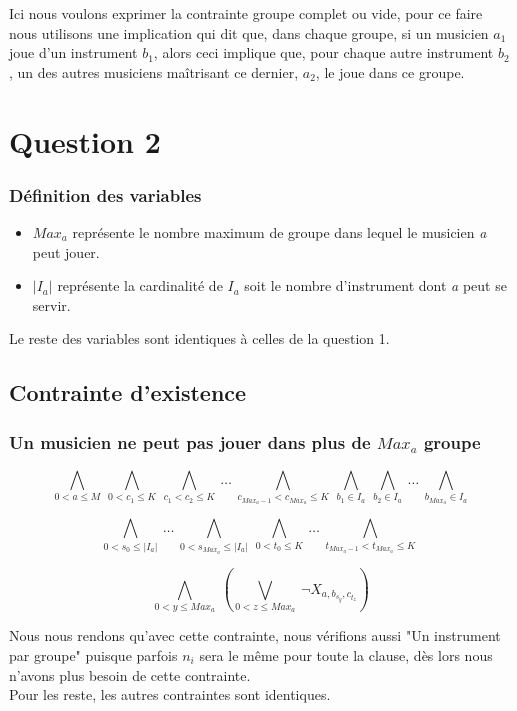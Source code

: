 \documentclass[11pt]{article}
\begin{document}
Ici nous voulons exprimer la contrainte groupe complet ou vide, pour ce faire nous utilisons une implication qui dit que, dans chaque groupe, si un musicien $a_1$ joue d'un instrument $b_1$, alors ceci implique que, pour chaque autre instrument $b_2$, un des autres musiciens maîtrisant ce dernier, $a_2$, le joue dans ce groupe.

\section{Question 2}

\subsubsection{Définition des variables}

\begin{itemize}
\item $Max_a$ représente le nombre maximum de groupe dans lequel le musicien \textit{a} peut jouer.
\item $|I_a|$ représente la cardinalité de $I_a$ soit le nombre d'instrument dont \textit{a} peut se servir.
\end{itemize}

Le reste des variables sont identiques à celles de la question 1.

\subsection{Contrainte d'existence}

\subsubsection{Un musicien ne peut pas jouer dans plus de $Max_a$ groupe}

$$\bigwedge\limits_{0<a\le M}\ \bigwedge\limits_{0<c_1\le K}\ \bigwedge\limits_{c_1<c_2\le K}\ \ldots\ \bigwedge\limits_{c_{{Max_a}-1}<c_{Max_a}\le K}\ \bigwedge\limits_{b_1 \in I_a}\ \bigwedge\limits_{b_2 \in I_a}\ \ldots\  \bigwedge\limits_{b_{Max_a} \in I_a} $$

$$\bigwedge\limits_{0<s_0\le |I_a|}\  \ldots\  \bigwedge\limits_{0<s_{Max_a}\le |I_a|}\ \bigwedge\limits_{0<t_{0}\le K}\  \ldots\  \bigwedge\limits_{t_{Max_a-1}<t_{Max_a}\le K}\ $$

$$ \bigwedge\limits_{0<y\le Max_a}\  \left( \bigvee\limits_{0<z\le Max_a}\  \neg X_{a,b_{s_{y}},c_{t_{z}}}\right)$$

Nous nous rendons qu'avec cette contrainte, nous vérifions aussi "Un instrument par groupe" puisque parfois $n_i$ sera le même pour toute la clause, dès lors nous n'avons plus besoin de cette contrainte.\\
Pour les reste, les autres contraintes sont identiques.\\
\end{document}
